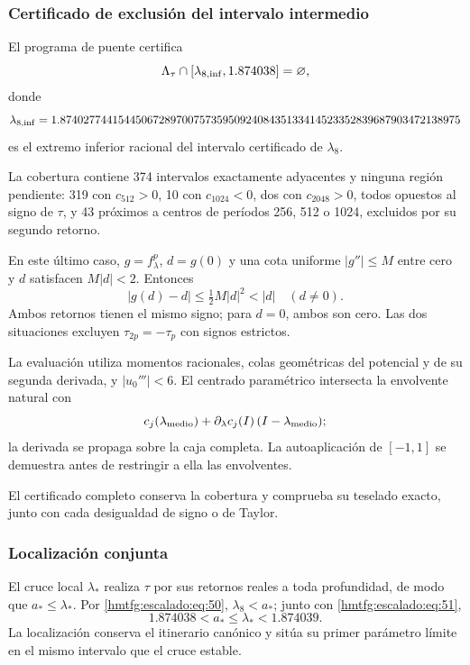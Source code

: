 \subsubsection{Certificado de exclusión del intervalo intermedio}
\label{hmtfg:escalado:15.3}

El programa de puente certifica
\begin{equation}
\Lambda_\tau\cap[\lambda_{8,\rm inf},1.874038]=\varnothing,
\label{hmtfg:escalado:eq:51}
\end{equation}
donde
\[
\lambda_{8,\rm inf}
=1.874027744154450672897007573595092408435133414523352839687903472138975
\]
es el extremo inferior racional del intervalo certificado de \(\lambda_8\).

La cobertura contiene 374 intervalos exactamente adyacentes y ninguna región pendiente: 319 con \(c_{512}>0\), 10 con \(c_{1024}<0\), dos con \(c_{2048}>0\), todos opuestos al signo de \(\tau\), y 43 próximos a centros de períodos 256, 512 o 1024, excluidos por su segundo retorno.

En este último caso, \(g=f_\lambda^p\), \(d=g(0)\) y una cota uniforme \(|g''|\le M\) entre cero y \(d\) satisfacen \(M|d|<2\). Entonces
\[
|g(d)-d|\le\tfrac12M|d|^2<|d|\quad(d\ne0).
\]
Ambos retornos tienen el mismo signo; para \(d=0\), ambos son cero. Las dos situaciones excluyen \(\tau_{2p}=-\tau_p\) con signos estrictos.

La evaluación utiliza momentos racionales, colas geométricas del potencial y de su segunda derivada, y \(|u_0'''|<6\). El centrado paramétrico intersecta la envolvente natural con
\[
c_j(\lambda_{\rm medio})+
\partial_\lambda c_j(I)\,(I-\lambda_{\rm medio});
\]
la derivada se propaga sobre la caja completa. La autoaplicación de \([-1,1]\) se demuestra antes de restringir a ella las envolventes.

El certificado completo conserva la cobertura y comprueba su teselado exacto, junto con cada desigualdad de signo o de Taylor.

\subsubsection{Localización conjunta}
\label{hmtfg:escalado:15.4}

El cruce local \(\lambda_*\) realiza \(\tau\) por sus retornos reales a toda profundidad, de modo que \(a_*\le\lambda_*\). Por \eqref{hmtfg:escalado:eq:50}, \(\lambda_8<a_*\); junto con \eqref{hmtfg:escalado:eq:51},
\begin{equation}
\boxed{1.874038<a_*\le\lambda_*<1.874039.}
\label{hmtfg:escalado:eq:52}
\end{equation}
La localización conserva el itinerario canónico y sitúa su primer parámetro límite en el mismo intervalo que el cruce estable.

